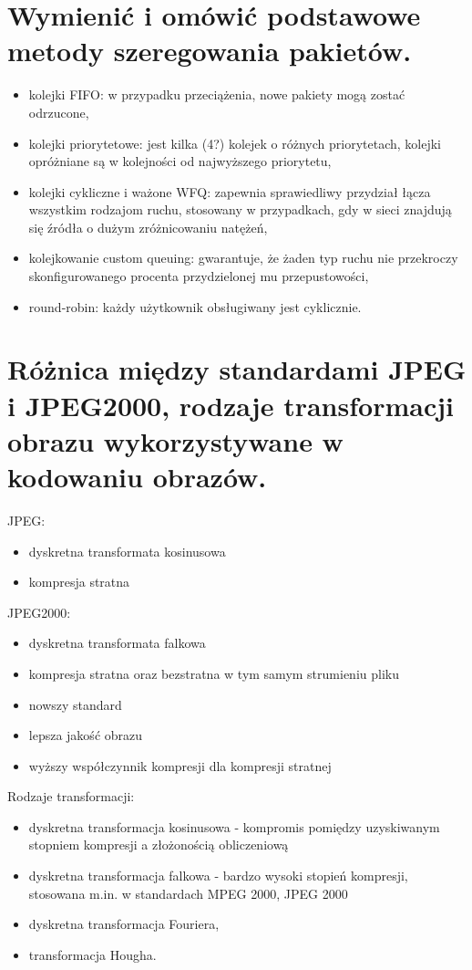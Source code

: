 \documentclass[12pt,a4paper]{article}
\begin{document}
	\section{Wymienić i omówić podstawowe metody szeregowania pakietów.}
	\begin{itemize}
		\item kolejki FIFO: w przypadku przeciążenia, nowe pakiety mogą zostać odrzucone,
		\item kolejki priorytetowe: jest kilka (4?) kolejek o różnych priorytetach, kolejki opróżniane są w kolejności od najwyższego priorytetu,
		\item kolejki cykliczne i ważone WFQ: zapewnia sprawiedliwy przydział łącza wszystkim rodzajom ruchu, stosowany w przypadkach, gdy w sieci znajdują się źródła o dużym zróżnicowaniu natężeń,
		\item kolejkowanie custom queuing: gwarantuje, że żaden typ ruchu nie przekroczy skonfigurowanego procenta przydzielonej mu przepustowości,
		\item round-robin: każdy użytkownik obsługiwany jest cyklicznie.
	\end{itemize}

	\section{Różnica między standardami JPEG i JPEG2000, rodzaje transformacji obrazu wykorzystywane w kodowaniu obrazów.}
	JPEG:
	\begin{itemize}
		\item dyskretna transformata kosinusowa
		\item kompresja stratna
	\end{itemize}
	JPEG2000:
	\begin{itemize}
		\item dyskretna transformata falkowa
		\item kompresja stratna oraz bezstratna w tym samym strumieniu pliku
		\item nowszy standard
		\item lepsza jakość obrazu
		\item wyższy współczynnik kompresji dla kompresji stratnej
	\end{itemize}
	Rodzaje transformacji:
	\begin{itemize}
		\item dyskretna transformacja kosinusowa - kompromis pomiędzy uzyskiwanym stopniem kompresji a złożonością obliczeniową
		\item dyskretna transformacja falkowa - bardzo wysoki stopień kompresji, stosowana m.in. w standardach MPEG 2000, JPEG 2000
		\item dyskretna transformacja Fouriera,
		\item transformacja Hougha.
	\end{itemize}
\end{document}
